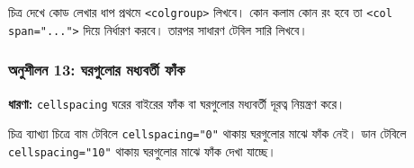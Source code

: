 \begin{minipage}[t]{.48\linewidth}\vspace{0pt}
\begin{keypointbox}{চিত্র দেখে কোড লেখার ধাপ}
প্রথমে \texttt{<colgroup>} লিখবে। কোন কলাম কোন রং হবে তা \texttt{<col span="...">} দিয়ে নির্ধারণ করবে। তারপর সাধারণ টেবিল সারি লিখবে।
\end{keypointbox}
\end{minipage}\par\smallskip




\par\noindent\subsubsection{অনুশীলন 13: ঘরগুলোর মধ্যবর্তী ফাঁক}\par\smallskip\textbf{ধারণা:}
\texttt{cellspacing} ঘরের বাইরের ফাঁক বা ঘরগুলোর মধ্যবর্তী দূরত্ব নিয়ন্ত্রণ করে।
\noindent
\begin{keypointbox}{চিত্র ব্যাখ্যা}
চিত্রে বাম টেবিলে \texttt{cellspacing="0"} থাকায় ঘরগুলোর মাঝে ফাঁক নেই। ডান টেবিলে \texttt{cellspacing="10"} থাকায় ঘরগুলোর মাঝে ফাঁক দেখা যাচ্ছে।
\end{keypointbox}

